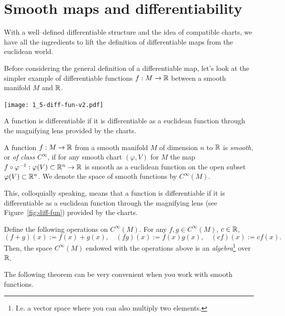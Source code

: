 \section{Smooth maps and differentiability}

With a well--defined differentiable structure and the idea of compatible charts, we have all the ingredients to lift the definition of differentiable maps from the euclidean world.

Before considering the general definition of a differentiable map, let's look at the simpler example of differentiable functions $f:M\to\mathbb{R}$ between a smooth manifold $M$ and $\mathbb{R}$.

\begin{marginfigure}
  \texttt{[image: 1\_5-diff-fun-v2.pdf]}
  \label{fig:diff-fun}
  \caption{A function is differentiable if it is differentiable as a euclidean function through the magnifying lens provided by the charts.}
\end{marginfigure}
\begin{definition}
  A function $f:M\to\mathbb{R}$ from a smooth manifold $M$ of dimension $n$ to $\mathbb{R}$ is \emph{smooth}, or \emph{of class $C^\infty$}, if for any smooth chart $(\varphi, V)$ for $M$ the map $f\circ\varphi^{-1}:\varphi(V)\subset\mathbb{R}^n \to \mathbb{R}$ is smooth as a euclidean function on the open subset $\varphi(V)\subset\mathbb{R}^n$.
  We denote the space of smooth functions by $C^\infty(M)$.
\end{definition}

This, colloquially speaking, means that a function is differentiable if it is differentiable as a euclidean function through the magnifying lens (see Figure~\ref{fig:diff-fun}) provided by the charts.

\begin{exercise}
  Define the following operations on $C^\infty(M)$.
  For any $f,g\in C^\infty(M)$, $c\in\mathbb{R}$,
  \begin{equation}
    (f+g)(x) := f(x) + g(x),\quad
    (fg)(x) := f(x) g(x),\quad
    (cf)(x) := c f(x).
  \end{equation}
  Then, the space $C^\infty(M)$ endowed with the operations above is an \emph{algebra}\footnote{I.e. a vector space where you can also multiply two elements.} over $\mathbb{R}$.
\end{exercise}

The following theorem can be very convenient when you work with smooth functions.

